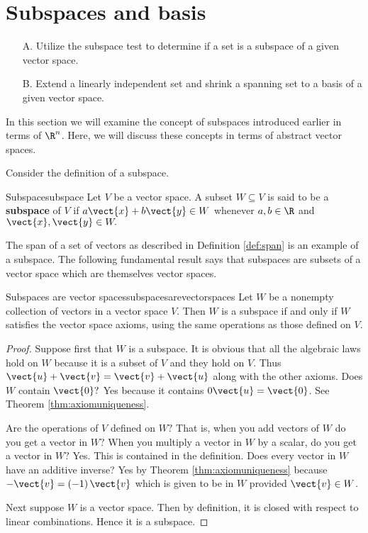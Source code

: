 \section{Subspaces and basis}

\begin{outcome}
\begin{enumerate}
\item[A.] Utilize the subspace test to determine if a set is a subspace of a given vector space.

\item[B.] Extend a linearly independent set and shrink a spanning set to a basis of a given vector space. 
\end{enumerate}
\end{outcome}

In this section we will examine the concept of subspaces introduced earlier in terms of $\R^n$. Here, we will discuss these concepts in terms of abstract vector spaces. 

Consider the definition of a subspace.

\begin{definition}{Subspace}{subspace}
Let $V$ be a vector space. A subset $W\subseteq V$ is said to be a \textbf{subspace} of $V$ if $a\vect{x}+b\vect{y}
\in W$ whenever $a,b\in \R$ and $\vect{x},\vect{y}\in W.$
\end{definition}

The span of a set of vectors as described in Definition \ref{def:span} is an example of a subspace. The following fundamental result says that subspaces are subsets of a
vector space which are themselves vector spaces.

\begin{theorem}{Subspaces are vector spaces}{subspacesarevectorspaces}
Let $W$ be a nonempty collection of vectors in a vector space $V$. Then $W$
is a subspace if and only if $W$ satisfies the vector space axioms, using the same
operations as those defined on $V$.
\end{theorem}

\begin{proof}
Suppose first that $W$ is a subspace. It is obvious that
all the algebraic laws hold on $W$ because it is a subset of $V$ and they
hold on $V$. Thus $\vect{u}+\vect{v}=\vect{v}+\vect{u}$ along with the other axioms. Does $W$
contain $\vect{0}?$ Yes because it contains $0\vect{u}=\vect{0}$. See
Theorem \ref{thm:axiomuniqueness}.

 Are the operations of $V$ defined on $W?$ That is,
when you add vectors of $W$ do you get a vector in $W?$ When you multiply a
vector in $W$ by a scalar, do you get a vector in $W?$ Yes. This is
contained in the definition. Does every vector in $W$ have an additive
inverse? Yes by Theorem \ref{thm:axiomuniqueness} because $-\vect{v}=\left(
-1\right) \vect{v}$ which is given to be in $W$ provided $\vect{v}\in W$.

Next suppose $W$ is a vector space. Then by definition, it is closed with
respect to linear combinations. Hence it is a subspace. 
\end{proof}

